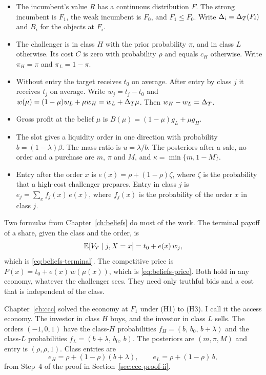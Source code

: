 \begin{itemize}
\item The incumbent's value \(R\) has a continuous distribution \(F\). The strong incumbent is \(F_1\), the weak
incumbent is \(F_0\), and \(F_1\le F_0\). Write \(\Delta_i=\Delta_T(F_i)\) and \(B_i\) for the objects at \(F_i\).
\item The challenger is in class \(H\) with the prior probability \(\pi\), and in class \(L\) otherwise. Its cost
\(C\) is zero with probability \(\rho\) and equals \(c_H\) otherwise. Write \(\pi_H=\pi\) and \(\pi_L=1-\pi\).
\item Without entry the target receives \(t_0\) on average. After entry by class \(j\) it receives \(t_j\) on
average. Write \(w_j=t_j-t_0\) and \(w(\mu)=(1-\mu)w_L+\mu w_H=w_L+\Delta_T\mu\). Then \(w_H-w_L=\Delta_T\).
\item Gross profit at the belief \(\mu\) is \(B(\mu)=(1-\mu)g_L+\mu g_H\).
\item The slot gives a liquidity order in one direction with probability \(b=(1-\lambda)\beta\). The mass ratio is
\(u=\lambda/b\). The posteriors after a sale, no order and a purchase are \(m\), \(\pi\) and \(M\), and
\(\kappa=\min\{m,1-M\}\).
\item Entry after the order \(x\) is \(e(x)=\rho+(1-\rho)\zeta\), where \(\zeta\) is the probability that a high-cost
challenger prepares. Entry in class \(j\) is \(e_j=\sum_xf_j(x)\,e(x)\), where \(f_j(x)\) is the probability of the
order \(x\) in class \(j\).
\end{itemize}

Two formulas from Chapter~\ref{ch:beliefs} do most of the work. The terminal payoff of a share, given the class and
the order, is
\begin{equation}\label{eq:welfare-terminal}
\mathbb{E}[V_T\mid j,X=x]=t_0+e(x)\,w_j,
\end{equation}
which is \eqref{eq:beliefs-terminal}. The competitive price is \(P(x)=t_0+e(x)\,w(\mu(x))\), which is
\eqref{eq:beliefs-price}. Both hold in any economy, whatever the challenger sees. They need only truthful bids and a
cost that is independent of the class.

Chapter~\ref{ch:ccc} solved the economy at \(F_1\) under (H1) to (H3). I call it the access economy. The investor in
class \(H\) buys, and the investor in class \(L\) sells. The orders \((-1,0,1)\) have the class-\(H\) probabilities
\(f_H=(b,\,b_0,\,b+\lambda)\) and the class-\(L\) probabilities \(f_L=(b+\lambda,\,b_0,\,b)\). The posteriors are
\((m,\pi,M)\) and entry is \((\rho,\rho,1)\). Class entries are
\begin{equation}\label{eq:welfare-classentry}
e_H=\rho+(1-\rho)(b+\lambda),\qquad e_L=\rho+(1-\rho)\,b ,
\end{equation}
from Step~4 of the proof in Section~\ref{sec:ccc-proof-ii}.

